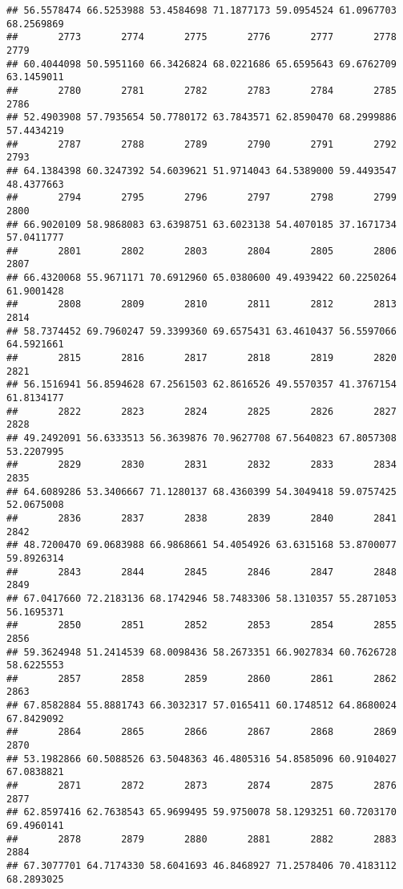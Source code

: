 \documentclass[
]{article}
\begin{document}
\begin{verbatim}
## 56.5578474 66.5253988 53.4584698 71.1877173 59.0954524 61.0967703 68.2569869 
##       2773       2774       2775       2776       2777       2778       2779 
## 60.4044098 50.5951160 66.3426824 68.0221686 65.6595643 69.6762709 63.1459011 
##       2780       2781       2782       2783       2784       2785       2786 
## 52.4903908 57.7935654 50.7780172 63.7843571 62.8590470 68.2999886 57.4434219 
##       2787       2788       2789       2790       2791       2792       2793 
## 64.1384398 60.3247392 54.6039621 51.9714043 64.5389000 59.4493547 48.4377663 
##       2794       2795       2796       2797       2798       2799       2800 
## 66.9020109 58.9868083 63.6398751 63.6023138 54.4070185 37.1671734 57.0411777 
##       2801       2802       2803       2804       2805       2806       2807 
## 66.4320068 55.9671171 70.6912960 65.0380600 49.4939422 60.2250264 61.9001428 
##       2808       2809       2810       2811       2812       2813       2814 
## 58.7374452 69.7960247 59.3399360 69.6575431 63.4610437 56.5597066 64.5921661 
##       2815       2816       2817       2818       2819       2820       2821 
## 56.1516941 56.8594628 67.2561503 62.8616526 49.5570357 41.3767154 61.8134177 
##       2822       2823       2824       2825       2826       2827       2828 
## 49.2492091 56.6333513 56.3639876 70.9627708 67.5640823 67.8057308 53.2207995 
##       2829       2830       2831       2832       2833       2834       2835 
## 64.6089286 53.3406667 71.1280137 68.4360399 54.3049418 59.0757425 52.0675008 
##       2836       2837       2838       2839       2840       2841       2842 
## 48.7200470 69.0683988 66.9868661 54.4054926 63.6315168 53.8700077 59.8926314 
##       2843       2844       2845       2846       2847       2848       2849 
## 67.0417660 72.2183136 68.1742946 58.7483306 58.1310357 55.2871053 56.1695371 
##       2850       2851       2852       2853       2854       2855       2856 
## 59.3624948 51.2414539 68.0098436 58.2673351 66.9027834 60.7626728 58.6225553 
##       2857       2858       2859       2860       2861       2862       2863 
## 67.8582884 55.8881743 66.3032317 57.0165411 60.1748512 64.8680024 67.8429092 
##       2864       2865       2866       2867       2868       2869       2870 
## 53.1982866 60.5088526 63.5048363 46.4805316 54.8585096 60.9104027 67.0838821 
##       2871       2872       2873       2874       2875       2876       2877 
## 62.8597416 62.7638543 65.9699495 59.9750078 58.1293251 60.7203170 69.4960141 
##       2878       2879       2880       2881       2882       2883       2884 
## 67.3077701 64.7174330 58.6041693 46.8468927 71.2578406 70.4183112 68.2893025 

\end{verbatim}
\end{document}
